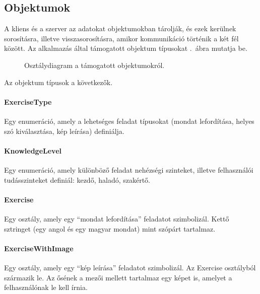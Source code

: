 \documentclass[11pt, a4paper]{article}
\begin{document}
    \subsection{Objektumok}
    A kliens és a szerver az adatokat objektumokban tárolják, és ezek kerülnek sorosításra, illetve visszasorosításra, amikor kommunikáció történik a két fél között. Az alkalmazás által támogatott objektum típusokat .~ábra mutatja be.    
    \begin{figure}[htbp]
    	\center
    	\caption{Osztálydiagram a támogatott objektumokról.}
    	\label{fig:objects-uml}
    \end{figure}
    Az objektum típusok a következők.
    
    \paragraph{ExerciseType} Egy enumeráció, amely a lehetséges feladat típusokat (mondat lefordítása, helyes szó kiválasztása, kép leírása) definiálja.
    
    \paragraph{KnowledgeLevel} Egy enumeráció, amely különböző feladat nehézségi szinteket, illetve felhasználói tudásszinteket definiál: kezdő, haladó, szakértő.
    
    \paragraph{Exercise} Egy osztály, amely egy ``mondat lefordítása'' feladatot szimbolizál. Kettő sztringet (egy angol és egy magyar mondat) mint szópárt tartalmaz.
    
    \paragraph{ExerciseWithImage} Egy osztály, amely egy ``kép leírása'' feladatot szimbolizál. Az Exercise osztályból származik le. Az ősének a mezői mellett tartalmaz egy képet is, amelyet a felhasználónak le kell írnia.
    
\end{document}
